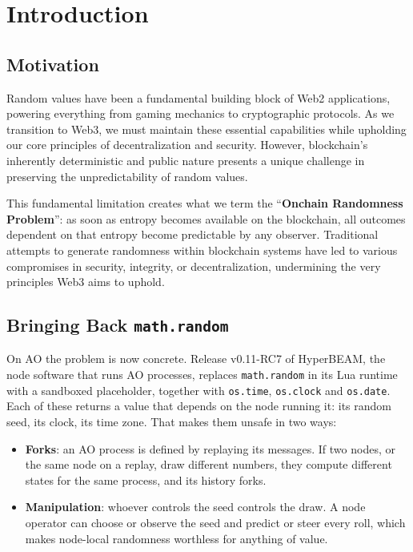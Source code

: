 \section{Introduction}\label{sec:introduction}


\subsection{Motivation}\label{sec:motivation}

Random values have been a fundamental building block of Web2 applications, powering everything from gaming mechanics to cryptographic protocols. As we transition to Web3, we must maintain these essential capabilities while upholding our core principles of decentralization and security. However, blockchain's inherently deterministic and public nature presents a unique challenge in preserving the unpredictability of random values.

This fundamental limitation creates what we term the ``\textbf{Onchain Randomness Problem}'': as soon as entropy becomes available on the blockchain, all outcomes dependent on that entropy become predictable by any observer. Traditional attempts to generate randomness within blockchain systems have led to various compromises in security, integrity, or decentralization, undermining the very principles Web3 aims to uphold.

\subsection{Bringing Back \texttt{math.random}}\label{sec:math_random}

On AO the problem is now concrete. Release v0.11-RC7 of HyperBEAM, the node software that runs AO processes, replaces \texttt{math.random} in its Lua runtime with a sandboxed placeholder, together with \texttt{os.time}, \texttt{os.clock} and \texttt{os.date}. Each of these returns a value that depends on the node running it: its random seed, its clock, its time zone. That makes them unsafe in two ways:

\begin{itemize}
    \item \textbf{Forks}: an AO process is defined by replaying its messages. If two nodes, or the same node on a replay, draw different numbers, they compute different states for the same process, and its history forks.
    \item \textbf{Manipulation}: whoever controls the seed controls the draw. A node operator can choose or observe the seed and predict or steer every roll, which makes node-local randomness worthless for anything of value.
\end{itemize}


